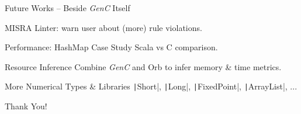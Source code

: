 \documentclass[xcolor={usenames,dvipsnames}]{beamer}
\newcommand{\GenC}{\emph{GenC}\xspace}
\newcommand{\InlineS}[1]{\texttt|#1|}
\begin{document}
\begin{frame}{Future Works -- Beside \GenC Itself}

  \begin{block}{MISRA}
    Linter: warn user about (more) rule violations.
  \end{block}

  \begin{block}{Performance: HashMap Case Study}
    Scala vs C comparison.
  \end{block}

  \begin{block}{Resource Inference}
    Combine \GenC and Orb to infer memory \& time metrics.
  \end{block}

  \begin{block}{More Numerical Types \& Libraries}
    \InlineS{Short}, \InlineS{Long}, \InlineS{FixedPoint}, \InlineS{ArrayList}, ...
  \end{block}

\end{frame}



\begin{frame}[standout]
  \Huge Thank You!
\end{frame}



\appendix

\begin{frame}[standout]
\end{frame}

\end{document}
